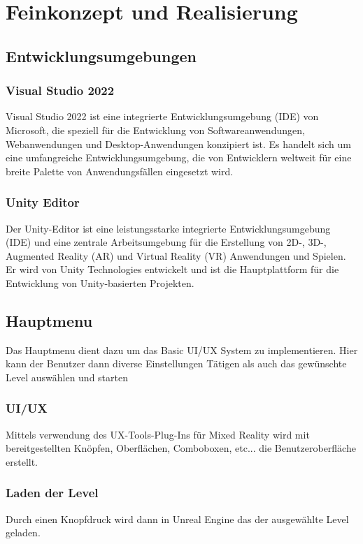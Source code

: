 \chapter{Feinkonzept und Realisierung}

\section{Entwicklungsumgebungen}
\subsection{Visual Studio 2022}
Visual Studio 2022 ist eine integrierte Entwicklungsumgebung (IDE) von Microsoft, die speziell für die Entwicklung von
Softwareanwendungen, Webanwendungen und Desktop-Anwendungen konzipiert ist. Es handelt sich um eine umfangreiche
Entwicklungsumgebung, die von Entwicklern weltweit für eine breite Palette von Anwendungsfällen eingesetzt wird.

\subsection{Unity Editor}
Der Unity-Editor ist eine leistungsstarke integrierte Entwicklungsumgebung (IDE) und eine zentrale Arbeitsumgebung
für die Erstellung von 2D-, 3D-, Augmented Reality (AR) und Virtual Reality (VR) Anwendungen und Spielen. Er wird von
Unity Technologies entwickelt und ist die Hauptplattform für die Entwicklung von Unity-basierten Projekten.

\section{Hauptmenu}
Das Hauptmenu dient dazu um das Basic UI/UX System zu implementieren.
Hier kann der Benutzer dann diverse Einstellungen Tätigen als auch
das gewünschte Level auswählen und starten

\subsection{UI/UX}
Mittels verwendung des UX-Tools-Plug-Ins für Mixed Reality wird
mit bereitgestellten Knöpfen, Oberflächen, Comboboxen, etc...
die Benutzeroberfläche erstellt.

\subsection{Laden der Level}
Durch einen Knopfdruck wird dann in Unreal Engine das der ausgewählte
Level geladen.

